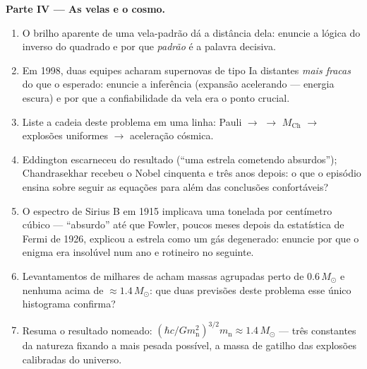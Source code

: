 \begin{problem}
\medskip\noindent\textbf{Parte IV --- As velas e o
cosmo.}
\begin{enumerate}[resume]
  \item O brilho aparente de uma vela-padrão dá a
        distância dela: enuncie a lógica do inverso do quadrado e por que
        \emph{padrão} é a palavra decisiva.
  \item Em 1998, duas equipes acharam supernovas de tipo Ia distantes
        \emph{mais fracas} do que o esperado: enuncie a inferência
        (expansão acelerando --- energia escura) e por que
        a confiabilidade da vela era o ponto crucial.
  \item Liste a cadeia deste problema em uma linha: Pauli $\to$
         $\to$ $M_{\text{Ch}}$ $\to$ explosões
        uniformes $\to$ aceleração cósmica.
  \item Eddington escarneceu do resultado (``uma estrela cometendo
        absurdos''); Chandrasekhar recebeu o Nobel
        cinquenta e três anos depois: o que o episódio ensina sobre
        seguir as equações para além das conclusões confortáveis?
  \item O espectro de Sirius B em 1915 implicava uma tonelada por
        centímetro cúbico --- ``absurdo'' até que Fowler, poucos meses
        depois da estatística de Fermi de 1926, explicou a estrela como
        um gás degenerado: enuncie por que o enigma era insolúvel num
        ano e rotineiro no seguinte.
  \item Levantamentos de milhares de  acham massas
        agrupadas perto de $0.6\,M_\odot$ e nenhuma acima de
        $\approx1.4\,M_\odot$: que duas previsões deste
        problema esse único histograma confirma?
  \item Resuma o resultado nomeado: $(\hbar c/Gm_{\text{n}}^2)^{
        3/2}m_{\text{n}} \approx 1.4\,M_\odot$ --- três constantes
        da natureza fixando a  mais pesada possível, a
        massa de gatilho das explosões calibradas do universo.
\end{enumerate}
\end{problem}
